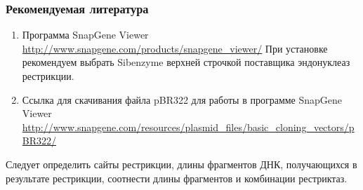 \subsubsection*{Рекомендуемая литература}

\begin{enumerate}
    \item Программа SnapGene Viewer \url{http://www.snapgene.com/products/snapgene_viewer/} При установке рекомендуем выбрать Sibenzyme верхней строчкой поставщика эндонуклеаз рестрикции. 
    \item Ссылка для скачивания файла pBR322 для работы в программе SnapGene Viewer \url{http://www.snapgene.com/resources/plasmid_files/basic_cloning_vectors/pBR322/}
\end{enumerate}

\explanationSection

Следует определить сайты рестрикции, длины фрагментов ДНК, получающихся в результате рестрикции, соотнести длины фрагментов и комбинации рестриктаз.

